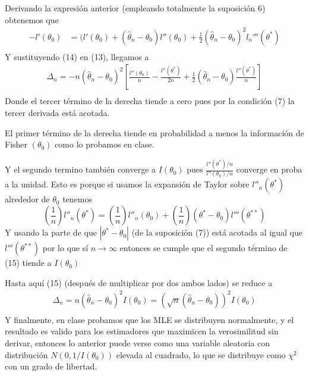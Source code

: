 \documentclass[peerreview]{IEEEtran}
\begin{document}
Derivando la expresión anterior (empleando totalmente la suposición 6) obtenemos que 
\begin{equation}
\begin{split}
-l'({\theta}_0) &=
( l'(\theta_0) +(\hat{\theta}_n - \theta_0)l''(\theta_0) + \frac{1}{2}(\hat{\theta}_n - \theta_0)^2l_n'''(\theta^*) \\
\end{split}
\end{equation}
Y sustituyendo (14) en (13), llegamos a 
\begin{equation}
\begin{split}
\Delta_n = -n(\hat{\theta}_n - \theta_0)^2
\left[\frac{l''(\theta_0)}{n} - \frac{l''(\theta^*)}{2n} + \frac{1}{2}(\hat{\theta}_n - \theta_0) \frac{l''(\theta^*)}{n} \right]\\
\end{split}
\end{equation}
Donde el tercer término de la derecha tiende a cero pues por la condición (7) la tercer derivada está acotada.

El primer término de la derecha tiende en probabilidad a menos la información de Fisher $(\theta_0)$ como lo probamos en clase.

Y el segundo termino también converge a $I(\theta_0)$ pues $\frac{l''(\theta^*)/n}{ l''(\theta_0)/n }$  converge en proba a la unidad. Esto es porque 
si usamos la expansión de Taylor sobre $l''_n(\theta^*)$ alrededor de $\theta_0$ tenemos
\[
(\frac{1}{n})l''_n(\theta^*) = (\frac{1}{n})l''_n(\theta_0) +(\frac{1}{n}) (\theta^*- \theta_0)l'''(\theta^{**}) 
\]
Y usando la parte de que $|\theta^* - \theta_0|$ (de la suposición (7))  está acotada al igual que $l'''(\theta^{**})$ por lo que sí $n \rightarrow \infty$ entonces se cumple que el segundo término de (15) tiende a $I(\theta_0)$

Hasta aquí (15) (después de multiplicar por dos ambos lados) se reduce a 
\begin{equation}
\begin{split}
\Delta_n = n(\hat{\theta}_n - \theta_0)^2I(\theta_0) = (\sqrt{n}(\hat{\theta}_n - \theta_0))^2I(\theta_0)\\
\end{split}
\end{equation}
Y finalmente, en clase probamos que los MLE se distribuyen normalmente, y el resultado es valido para los estimadores que maximicen la verosimilitud sin derivar, entonces lo anterior puede verse como una variable aleatoria con distribución $N(0,1/I(\theta_0)) $ elevada al cuadrado, lo que se distribuye como $\chi^2$ con un grado de libertad.
\end{document}
